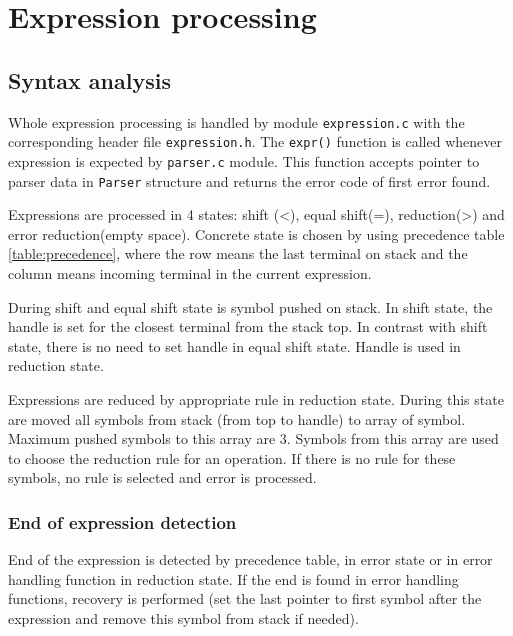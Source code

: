 \section{Expression processing} \label{expressions}

\subsection{Syntax analysis}


Whole expression processing is handled by module \verb|expression.c| with the corresponding header file \verb|expression.h|.
The \verb|expr()| function is called whenever expression is expected by \verb|parser.c| module. This function accepts pointer to parser data in \verb|Parser| structure and returns the error code of first error found. 

Expressions are processed in 4 states: shift (\textless), equal shift(=), reduction(\textgreater) and error reduction(empty space).
Concrete state is chosen by using precedence table \ref{table:precedence}, where the row means the last terminal on stack and the column means incoming terminal in the current expression.

During shift and equal shift state is symbol pushed on stack. In shift state, the handle is set for the closest terminal from the stack top. 
In contrast with shift state, there is no need to set handle in equal shift state.
Handle is used in reduction state. 

Expressions are reduced by appropriate rule in reduction state. During this state are moved all symbols from stack (from top to handle) to array of symbol. Maximum pushed symbols to this array are 3. Symbols from this array are used to choose the reduction rule for an operation. If there is no rule for these symbols, no rule is selected and error is processed. 

\subsubsection{End of expression detection}
End of the expression is detected by precedence table, in error state or in error handling function in reduction state. If the end is found in error handling functions, recovery is performed (set the last pointer to first symbol after the expression and remove this symbol from stack if needed).


